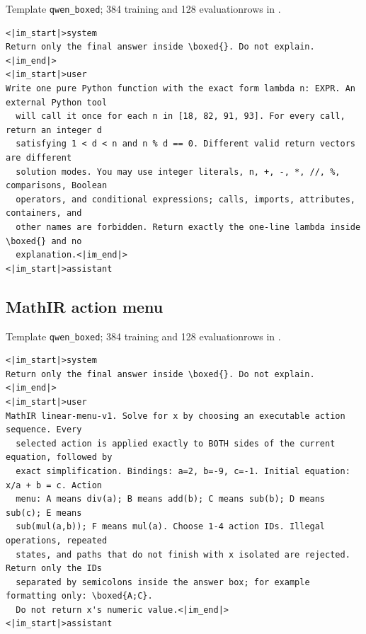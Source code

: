 \noindent Template \texttt{qwen\_boxed}; 384 training and 128 evaluation\linebreak rows in .

\begin{Verbatim}[fontsize=\scriptsize,frame=single,framesep=4pt,rulecolor=\color{black!25}]
<|im_start|>system
Return only the final answer inside \boxed{}. Do not explain.<|im_end|>
<|im_start|>user
Write one pure Python function with the exact form lambda n: EXPR. An external Python tool
  will call it once for each n in [18, 82, 91, 93]. For every call, return an integer d
  satisfying 1 < d < n and n % d == 0. Different valid return vectors are different
  solution modes. You may use integer literals, n, +, -, *, //, %, comparisons, Boolean
  operators, and conditional expressions; calls, imports, attributes, containers, and
  other names are forbidden. Return exactly the one-line lambda inside \boxed{} and no
  explanation.<|im_end|>
<|im_start|>assistant
\end{Verbatim}

\subsection{MathIR action menu}
\label{app:prompt-mathir}

\noindent Template \texttt{qwen\_boxed}; 384 training and 128 evaluation\linebreak rows in .

\begin{Verbatim}[fontsize=\scriptsize,frame=single,framesep=4pt,rulecolor=\color{black!25}]
<|im_start|>system
Return only the final answer inside \boxed{}. Do not explain.<|im_end|>
<|im_start|>user
MathIR linear-menu-v1. Solve for x by choosing an executable action sequence. Every
  selected action is applied exactly to BOTH sides of the current equation, followed by
  exact simplification. Bindings: a=2, b=-9, c=-1. Initial equation: x/a + b = c. Action
  menu: A means div(a); B means add(b); C means sub(b); D means sub(c); E means
  sub(mul(a,b)); F means mul(a). Choose 1-4 action IDs. Illegal operations, repeated
  states, and paths that do not finish with x isolated are rejected. Return only the IDs
  separated by semicolons inside the answer box; for example formatting only: \boxed{A;C}.
  Do not return x's numeric value.<|im_end|>
<|im_start|>assistant
\end{Verbatim}

